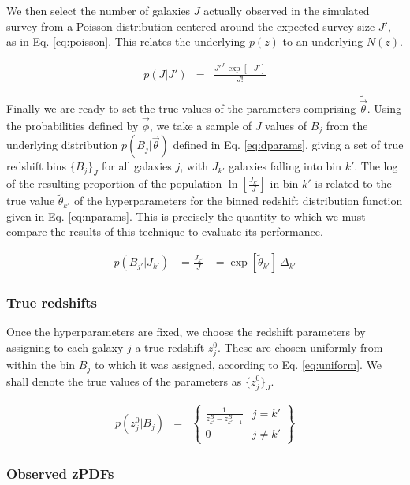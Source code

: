 \documentclass[preprint]{aastex}
\begin{document}
We then select the number of galaxies $J$ actually observed in the simulated survey from a Poisson distribution centered around the expected survey size $J'$, as in Eq. \ref{eq:poisson}.  This relates the underlying $p(z)$ to an underlying $N(z)$.

\begin{eqnarray}
\label{eq:poisson}
p(J|J') &=& \frac{J'^{J}\ \exp[-J']}{J!}
\end{eqnarray}

Finally we are ready to set the true values of the parameters comprising $\tilde{\vec{\theta}}$.  Using the probabilities defined by $\vec{\phi}$, we take a sample of $J$ values of $B_{j}$ from the underlying distribution $p(B_{j}|\vec{\theta})$ defined in Eq. \ref{eq:dparams}, giving a set of true redshift bins $\{B_{j}\}_{J}$ for all galaxies $j$, with $J_{k'}$ galaxies falling into bin $k'$.  The log of the resulting proportion of the population $\ln[\frac{J_{k'}}{J}]$ in bin $k'$ is related to the true value $\tilde{\theta}_{k'}$ of the hyperparameters for the binned redshift distribution function given in Eq. \ref{eq:nparams}.  This is precisely the quantity to which we must compare the results of this technique to evaluate its performance.

\begin{eqnarray}
\label{eq:nparams}
p(B_{j'}|J_{k'}) &= \frac{J_{k'}}{J} &= \exp[\tilde{\theta}_{k'}]\ \Delta_{k'}
\end{eqnarray}

\clearpage
\subsubsection{True redshifts}
\label{sec:z}

Once the hyperparameters are fixed, we choose the redshift parameters by assigning to each galaxy $j$ a true redshift $z_{j}^{0}$.  These are chosen uniformly from within the bin $B_{j}$ to which it was assigned, according to Eq. \ref{eq:uniform}.  We shall denote the true values of the parameters as $\{z_{j}^{0}\}_{J}$. 

\begin{eqnarray}
\label{eq:uniform}
p(z_{j}^{0}|B_{j}) &=& \left\{\begin{array}{cc}\frac{1}{z^{B}_{k'}-z^{B}_{k'-1}} & j = k'\\0 & j \neq k'\end{array}\right\}
\end{eqnarray}

\clearpage
\subsubsection{Observed zPDFs}
\label{sec:d}
\end{document}
